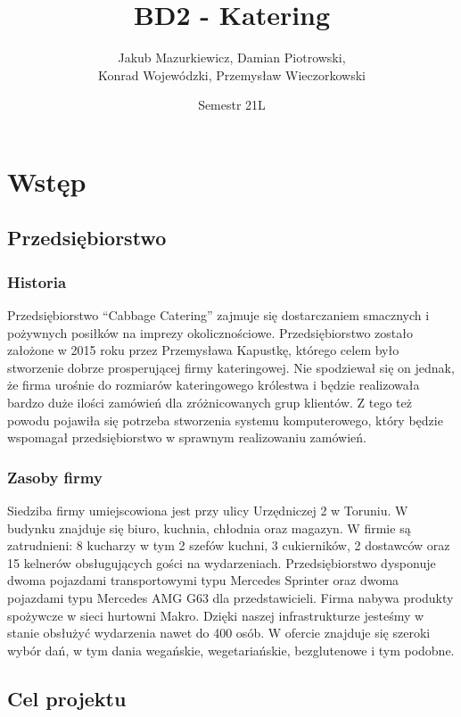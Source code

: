 \documentclass[10pt]{article}
\title{BD2 - Katering}
\author{Jakub Mazurkiewicz, Damian Piotrowski,\\Konrad Wojewódzki, Przemysław Wieczorkowski}
\date{Semestr 21L}
\newcommand{\quotes}[1]{``#1''}
\begin{document}
\maketitle

\section{Wstęp}

\subsection{Przedsiębiorstwo}

\subsubsection{Historia}

Przedsiębiorstwo \quotes{Cabbage Catering} zajmuje się dostarczaniem smacznych i pożywnych posiłków na imprezy okolicznościowe. Przedsiębiorstwo zostało założone w 2015 roku przez Przemysława Kapustkę, którego celem było stworzenie dobrze prosperującej firmy kateringowej. Nie spodziewał się on jednak, że firma urośnie do rozmiarów kateringowego królestwa i będzie realizowała bardzo duże ilości zamówień dla zróżnicowanych grup klientów. Z tego też powodu pojawiła się potrzeba stworzenia systemu komputerowego, który będzie wspomagał przedsiębiorstwo w sprawnym realizowaniu zamówień.

\subsubsection{Zasoby firmy}

Siedziba firmy umiejscowiona jest przy ulicy Urzędniczej 2 w Toruniu. W budynku znajduje się biuro, kuchnia, chłodnia oraz magazyn. W firmie są zatrudnieni: 8 kucharzy w tym 2 szefów kuchni, 3 cukierników, 2 dostawców oraz 15 kelnerów obsługujących gości na wydarzeniach. Przedsiębiorstwo dysponuje dwoma pojazdami transportowymi typu Mercedes Sprinter oraz dwoma pojazdami typu Mercedes AMG G63 dla przedstawicieli. Firma nabywa produkty spożywcze w sieci hurtowni Makro. Dzięki naszej infrastrukturze jesteśmy w stanie obsłużyć wydarzenia nawet do 400 osób. W ofercie znajduje się szeroki wybór dań, w tym dania wegańskie, wegetariańskie, bezglutenowe i tym podobne.

\subsection{Cel projektu}
\end{document}
